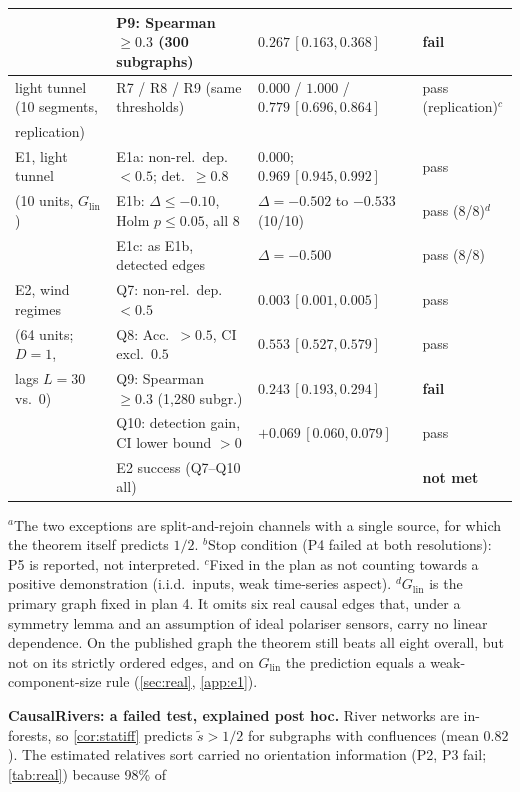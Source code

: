 \documentclass[pdflatex,sn-apa]{sn-jnl}
\theoremstyle{thmstyleone}
\theoremstyle{thmstylethree}
\theoremstyle{thmstyletwo}
\begin{document}
\begin{table}
\begin{tabular}{llll}
 & P9: Spearman $\ge0.3$ (300 subgraphs) & $0.267\,[0.163,0.368]$ & \textbf{fail} \\
\midrule
light tunnel (10 segments, & R7 / R8 / R9 (same thresholds) & $0.000$ / $1.000$ / $0.779\,[0.696,0.864]$ & pass (replication)$^c$ \\
replication) &&& \\
\midrule
E1, light tunnel & E1a: non-rel.\ dep.\ $<0.5$; det.\ $\ge0.8$ & $0.000$; $0.969\,[0.945,0.992]$ & pass \\
(10 units, $G_{\mathrm{lin}}$) & E1b: $\Delta\le-0.10$, Holm $p\le0.05$, all 8 & $\Delta=-0.502$ to $-0.533$ (10/10) & pass (8/8)$^d$ \\
 & E1c: as E1b, detected edges & $\Delta=-0.500$ & pass (8/8) \\
\midrule
E2, wind regimes & Q7: non-rel.\ dep.\ $<0.5$ & $0.003\,[0.001,0.005]$ & pass \\
(64 units; $D{=}1$, & Q8: Acc.\ $>0.5$, CI excl.\ $0.5$ & $0.553\,[0.527,0.579]$ & pass \\
lags $L{=}30$ vs.\ 0) & Q9: Spearman $\ge0.3$ (1,280 subgr.) & $0.243\,[0.193,0.294]$ & \textbf{fail} \\
 & Q10: detection gain, CI lower bound $>0$ & $+0.069\,[0.060,0.079]$ & pass \\
 & E2 success (Q7--Q10 all) & & \textbf{not met} \\
\bottomrule
\end{tabular}
\par\smallskip 
{\footnotesize $^a$The two exceptions are split-and-rejoin channels with a
single source, for which the theorem itself predicts $1/2$.
$^b$Stop condition (P4 failed at both resolutions): P5 is reported, not
interpreted. $^c$Fixed in the plan as not counting towards a positive
demonstration (i.i.d.\ inputs, weak time-series aspect).
$^d$$G_{\mathrm{lin}}$ is the primary graph fixed in plan 4. It omits six real causal edges
that, under a symmetry lemma and an assumption of ideal polariser sensors, carry no linear dependence.
On the published graph the theorem still beats all eight overall, but not on its strictly
ordered edges, and on $G_{\mathrm{lin}}$ the prediction equals a weak-component-size rule (\cref{sec:real}, \cref{app:e1}).}
\end{table}
\textbf{CausalRivers: a failed test, explained post hoc.} River networks
are in-forests, so \cref{cor:statiff} predicts $\tilde s>1/2$ for subgraphs
with confluences (mean $0.82$). The estimated relatives sort carried no
orientation information (P2, P3 fail; \cref{tab:real}) because 98\% of
\end{document}
